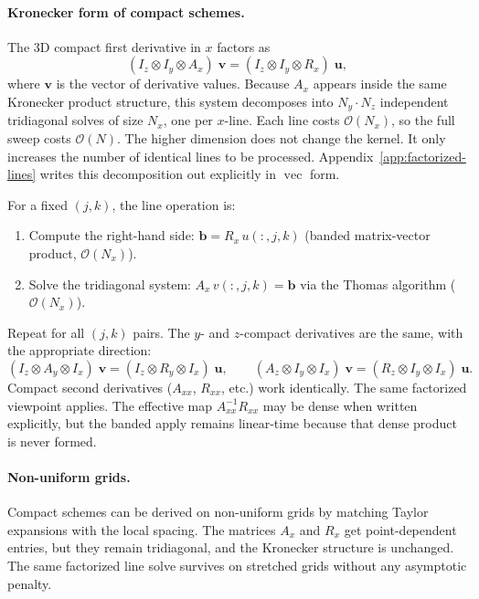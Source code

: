 \documentclass[11pt]{article}
\newcommand{\kron}{\otimes}
\newcommand{\Ix}{I_{x}}
\newcommand{\Iy}{I_{y}}
\newcommand{\Iz}{I_{z}}
\newcommand{\Ax}{A_{x}}
\newcommand{\Ay}{A_{y}}
\newcommand{\Az}{A_{z}}
\newcommand{\Axx}{A_{xx}}
\newcommand{\Rx}{R_{x}}
\newcommand{\Ry}{R_{y}}
\newcommand{\Rz}{R_{z}}
\newcommand{\Rxx}{R_{xx}}
\newcommand{\vect}{\operatorname{vec}}
\newcommand{\bigO}{\mathcal{O}}
\newcommand{\Nall}{N}
\begin{document}
\paragraph{Kronecker form of compact schemes.}
The 3D compact first derivative in $x$ factors as
\begin{equation}
\label{eq:3d-compact-Dx}
  (\Iz \kron \Iy \kron \Ax)\;\bm{v}
  =
  (\Iz \kron \Iy \kron \Rx)\;\bm{u},
\end{equation}
where $\bm{v}$ is the vector of derivative values.  Because $\Ax$
appears inside the same Kronecker product structure, this system
decomposes into $N_y \cdot N_z$ independent tridiagonal solves of
size $N_x$, one per $x$-line.  Each line costs $\bigO(N_x)$, so the
full sweep costs $\bigO(\Nall)$.  The higher dimension does not
change the kernel.  It only increases the number of identical lines to
be processed.
Appendix~\ref{app:factorized-lines} writes this decomposition out
explicitly in $\vect{}$ form.

For a fixed $(j,k)$, the line operation is:
\begin{enumerate}
  \item Compute the right-hand side: $\bm{b} = \Rx\,u(:,j,k)$
        (banded matrix-vector product, $\bigO(N_x)$).
  \item Solve the tridiagonal system: $\Ax\,v(:,j,k) = \bm{b}$
        via the Thomas algorithm ($\bigO(N_x)$).
\end{enumerate}
Repeat for all $(j,k)$ pairs.  The $y$- and $z$-compact derivatives
are the same, with the appropriate direction:
\begin{equation}
  (\Iz \kron \Ay \kron \Ix)\;\bm{v}
  = (\Iz \kron \Ry \kron \Ix)\;\bm{u},
  \qquad
  (\Az \kron \Iy \kron \Ix)\;\bm{v}
  = (\Rz \kron \Iy \kron \Ix)\;\bm{u}.
\end{equation}
Compact second derivatives ($\Axx$, $\Rxx$, etc.) work identically.
The same factorized viewpoint applies.  The effective map
$\Axx^{-1}\Rxx$ may be dense when written explicitly, but the banded
apply remains linear-time because that dense product is never formed.

\paragraph{Non-uniform grids.}
Compact schemes can be derived on non-uniform grids by matching Taylor
expansions with the local spacing.  The matrices $\Ax$ and $\Rx$ get
point-dependent entries, but they remain tridiagonal, and the Kronecker
structure is unchanged.  The same factorized line solve survives on
stretched grids without any asymptotic penalty.
\end{document}
